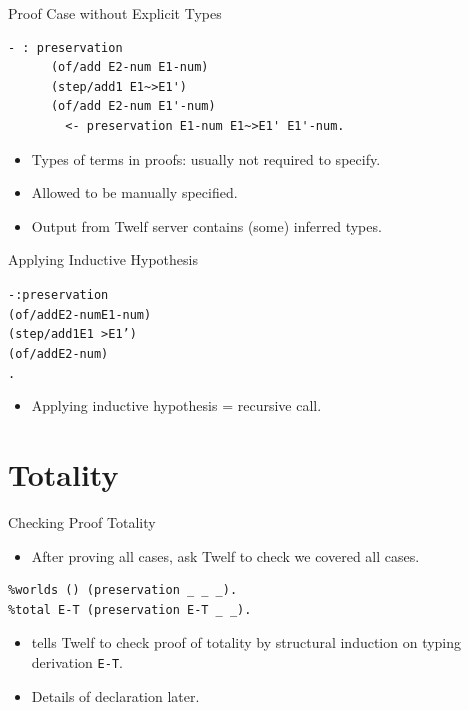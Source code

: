 \documentclass{beamer}
\begin{document}
\begin{frame}[containsverbatim]{Proof Case without Explicit Types}
\begin{verbatim}
- : preservation
      (of/add E2-num E1-num)
      (step/add1 E1~>E1')
      (of/add E2-num E1'-num)
        <- preservation E1-num E1~>E1' E1'-num.
\end{verbatim}

\begin{itemize}
\item Types of terms in proofs: usually not required to specify.
\item Allowed to be manually specified.
\item Output from Twelf server contains (some) inferred types.
\end{itemize}
\end{frame}


\begin{frame}[containsverbatim]{Applying Inductive Hypothesis}
\begin{alltt}
- : preservation
      (of/add E2-num E1-num)
      (step/add1 E1~>E1')
      (of/add E2-num )
        .
\end{alltt}

\begin{itemize}
\item Applying inductive hypothesis = recursive call.
\end{itemize}
\end{frame}

\section{Totality}

\begin{frame}[containsverbatim]{Checking Proof Totality}
\begin{itemize}
\item After proving all cases, ask Twelf to check we
covered all cases.
\end{itemize}
{
\color{red}
\begin{verbatim}
%worlds () (preservation _ _ _).
%total E-T (preservation E-T _ _).
\end{verbatim}
}
\begin{itemize}
\item \texttt{} tells Twelf to check
proof of totality by structural induction on typing derivation
\texttt{E-T}.

\item Details of \texttt{} declaration later.
\end{itemize}
\end{frame}
\end{document}
